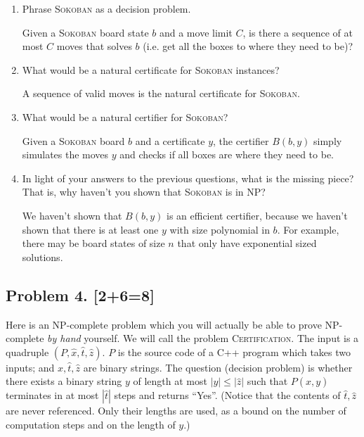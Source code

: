 \documentclass[10pt]{article}
\begin{document}
\begin{enumerate}
\item Phrase \textsc{Sokoban} as a decision problem.

Given a \textsc{Sokoban} board state \(b\) and a move limit \(C\), is there a sequence of at most \(C\) moves that solves \(b\) (i.e. get all the boxes to where they need to be)? 

\item What would be a natural certificate for \textsc{Sokoban} instances?

A sequence of valid moves is the natural certificate for \textsc{Sokoban}.

\item What would be a natural certifier for \textsc{Sokoban}?

Given a \textsc{Sokoban} board \(b\) and a certificate \(y\), the certifier \(B(b, y)\) simply simulates the moves \(y\) and checks if all boxes are where they need to be.

\item In light of your answers to the previous questions, what is the missing piece? That is, why haven't you shown that \textsc{Sokoban} is in NP?

We haven't shown that \(B(b, y)\) is an efficient certifier, because we haven't shown that there is at least one \(y\) with size polynomial in \(b\). For example, there may be board states of size \(n\) that only have exponential sized solutions.
\end{enumerate}

\subsection*{Problem 4. [2+6=8]}
Here is an NP-complete problem which you will actually be able to prove NP-complete \emph{by hand} yourself.
We will call the problem \textsc{Certification}. The input is a quadruple $(P, \hat{x}, \hat{t}, \hat{z})$. $P$ is the source code of a C++ program which takes two inputs; and $\hat{x}, \hat{t}, \hat{z}$ are binary strings. The question (decision problem) is whether there exists a binary string $y$ of length at most $|y| \leq |\hat{z}|$ such that $P(\hat{x},y)$ terminates in at most $|\hat{t}|$ steps and returns ``Yes''.
(Notice that the contents of $\hat{t}, \hat{z}$ are never referenced. Only their lengths are used, as a bound on the number of computation steps and on the length of $y$.)
\end{document}
